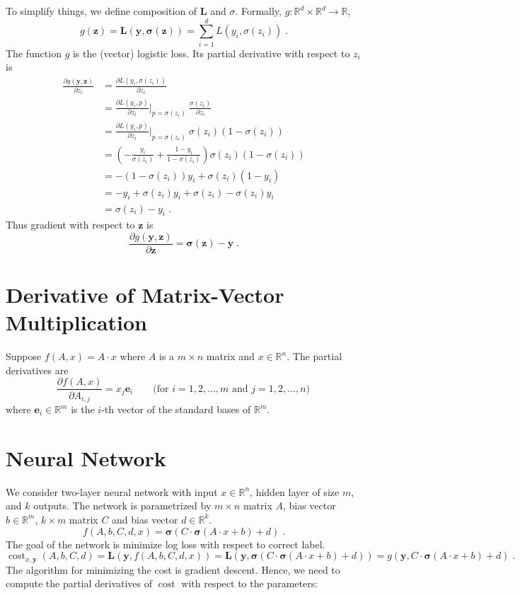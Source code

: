 \documentclass[12pt]{article}
\DeclareMathOperator{\cost}{cost}
\newcommand{\R}{\mathbb{R}}
\newcommand{\bsigma}{\pmb{\sigma}}
\newcommand{\y}{\mathbf{y}}
\newcommand{\z}{\mathbf{z}}
\newcommand{\e}{\mathbf{e}}
\renewcommand{\L}{\mathbf{L}}
\begin{document}
To simplify things, we define composition of $\L$ and $\sigma$.
Formally, $g:\R^d \times \R^d \to \R$,
$$
g(\z) = \L(\y, \bsigma(\z)) = \sum_{i=1}^d L(y_i, \sigma(z_i)) \; .
$$
The function $g$ is the (vector) logistic loss.
Its partial derivative with respect to $z_i$ is
\begin{align*}
\frac{\partial g(\y, \z)}{\partial z_i}
& = \frac{\partial L(y_i, \sigma(z_i))}{\partial z_i} \\
& = \frac{\partial L(y_i, p)}{\partial z_i} \bigg|_{p=\sigma(z_i)} \ \frac{\sigma(z_i)}{\partial z_i} \\
& = \frac{\partial L(y_i, p)}{\partial z_i} \bigg|_{p=\sigma(z_i)} \ \sigma(z_i) (1 - \sigma(z_i)) \\
& = \left(  - \frac{y_i}{\sigma(z_i)} + \frac{1-y_i}{1-\sigma(z_i)} \right)  \sigma(z_i) (1 - \sigma(z_i)) \\
& =  - (1 - \sigma(z_i)) y_i  + \sigma(z_i) (1-y_i)   \\
& =  - y_i + \sigma(z_i) y_i  + \sigma(z_i) - \sigma(z_i)y_i   \\
& =  \sigma(z_i) - y_i \; .
\end{align*}
Thus gradient with respect to $\z$ is
$$
\frac{\partial g(\y, \z)}{\partial \z} = \bsigma(\z) - \y  \; .
$$

\section{Derivative of Matrix-Vector Multiplication}

Suppose $f(A,x) = A \cdot x$ where $A$ is a $m \times n$ matrix and $x \in \R^n$.
The partial derivatives are
$$
\frac{\partial f(A,x)}{\partial A_{i,j}} = x_j \e_i \qquad \text{(for $i=1,2,\dots,m$ and $j=1,2,\dots,n$)} \,
$$
where $\e_i \in \R^m$ is the $i$-th vector of the standard bases of $\R^m$.

\section{Neural Network}

We consider two-layer neural network with input $x \in \R^n$, hidden layer of size $m$, and $k$ outputs.
The network is parametrized by $m \times n$ matrix $A$, bias vector $b \in \R^m$, $k \times m$ matrix $C$ and bias vector $d \in \R^k$.
$$
f(A,b,C,d,x) = \bsigma(C \cdot \bsigma(A \cdot x + b) + d) \; .
$$
The goal of the network is minimize log loss with respect to correct label.
$$
\cost_{x,\y}(A,b,C,d) = \L(\y, f(A,b,C,d,x)) = \L(\y, \bsigma(C \cdot \bsigma(A \cdot x + b) + d)) = g(\y, C \cdot \bsigma(A \cdot x + b) + d) \; .
$$
The algorithm for minimizing the cost is gradient descent. Hence, we need to
compute the partial derivatives of $\cost$ with respect to the parameters:
\end{document}
